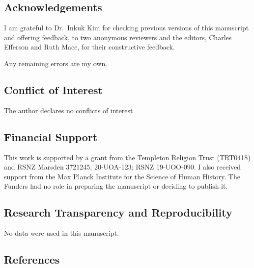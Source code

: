 \documentclass[
  single column]{article}
\begin{document}
\newpage{}

\subsection{Acknowledgements}\label{acknowledgements}

I am grateful to Dr.~Inkuk Kim for checking previous versions of this
manuscript and offering feedback, to two anonymous reviewers and the
editors, Charles Efferson and Ruth Mace, for their constructive
feedback.

Any remaining errors are my own.

\subsection{Conflict of Interest}\label{conflict-of-interest}

The author declares no conflicts of interest

\subsection{Financial Support}\label{financial-support}

This work is supported by a grant from the Templeton Religion Trust
(TRT0418) and RSNZ Marsden 3721245, 20-UOA-123; RSNZ 19-UOO-090. I also
received support from the Max Planck Institute for the Science of Human
History. The Funders had no role in preparing the manuscript or deciding
to publish it.

\subsection{Research Transparency and
Reproducibility}\label{research-transparency-and-reproducibility}

No data were used in this manuscript.

\newpage{}

\subsection{References}\label{references}
\end{document}
